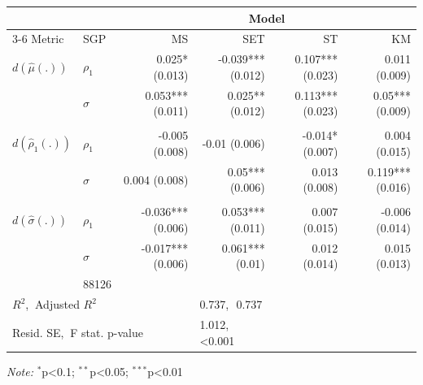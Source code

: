 \begin{tabular}{@{\extracolsep{\fill}}l|l|rrrr}
\toprule\toprule
\multicolumn{2}{l}{} & \multicolumn{4}{c}{{Model}} \\ 
\cmidrule(lr){3-6}
Metric & SGP & MS & SET & ST & KM \\ 
\midrule\addlinespace[2.5pt]
\(d(\hat{\mu}(.))\) & \(\rho_{1}\) & 0.025* (0.013) & -0.039*** (0.012) & 0.107*** (0.023) & 0.011 (0.009) \\ 
 & \(\sigma\) & 0.053*** (0.011) & 0.025** (0.012) & 0.113*** (0.023) & 0.05*** (0.009) \\ 
 &  &  &  &  &  \\ 
\(d(\hat{\rho}_1(.))\) & \(\rho_{1}\) & -0.005 (0.008) & -0.01 (0.006) & -0.014* (0.007) & 0.004 (0.015) \\ 
 & \(\sigma\) & 0.004 (0.008) & 0.05*** (0.006) & 0.013 (0.008) & 0.119*** (0.016) \\ 
 &  &  &  &  &  \\ 
\(d(\hat{\sigma}(.))\) & \(\rho_{1}\) & -0.036*** (0.006) & 0.053*** (0.011) & 0.007 (0.015) & -0.006 (0.014) \\ 
 & \(\sigma\) & -0.017*** (0.006) & 0.061*** (0.01) & 0.012 (0.014) & 0.015 (0.013) \\ 
\midrule\addlinespace[2.5pt]
\multicolumn{3}{l|}{Observations} & \multicolumn{1}{l}{88126} \\
\multicolumn{3}{l|}{$R^2$,$~$ Adjusted $R^2$} & \multicolumn{1}{l}{0.737,$~~~$0.737} \\
\multicolumn{3}{l|}{Resid. SE,$~$ F stat. p-value} & \multicolumn{1}{l}{1.012,$~~~$<0.001} \\
\bottomrule\bottomrule
\end{tabular}
\begin{minipage}{\linewidth}\centering
\vspace{.05em}
\emph{Note:}  \(^{*}\)p\textless{}0.1; \(^{**}\)p\textless{}0.05; \(^{***}\)p\textless{}0.01\\
\end{minipage}
